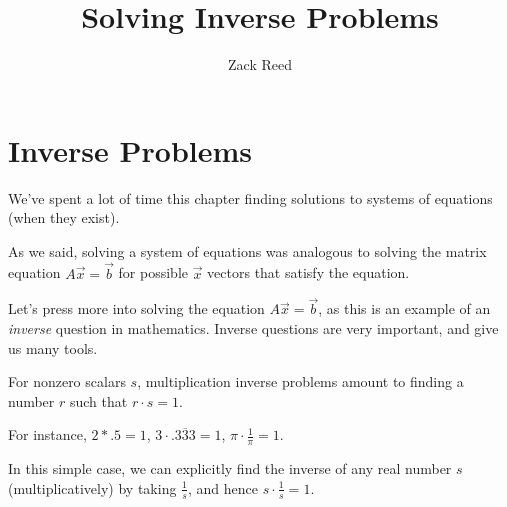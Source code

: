 \documentclass{ximera}
\author{Zack Reed}
\title{Solving Inverse Problems}
\begin{document}
\begin{abstract}



\end{abstract}
\maketitle


\section*{Inverse Problems}

We've spent a lot of time this chapter finding solutions to systems of equations (when they exist).

As we said, solving a system of equations was analogous to solving the matrix equation $A\vec{x}=\vec{b}$ for possible $\vec{x}$ vectors that satisfy the equation. 

Let's press more into solving the equation $A\vec{x}=\vec{b}$, as this is an example of an \emph{inverse} question in mathematics. Inverse questions are very important, and give us many tools.

\begin{example}

  For nonzero scalars $s$, multiplication inverse problems amount to finding a number $r$ such that $r\cdot s=1$.

  For instance, $2*.5=1$, $3\cdot .\overline{333}=1$, $\pi\cdot \frac{1}{\pi}=1$. 

  In this simple case, we can explicitly find the inverse of any real number $s$ (multiplicatively) by taking $\frac{1}{s}$, and hence $s\cdot\frac{1}{s}=1$.

\end{example}
\end{document}
